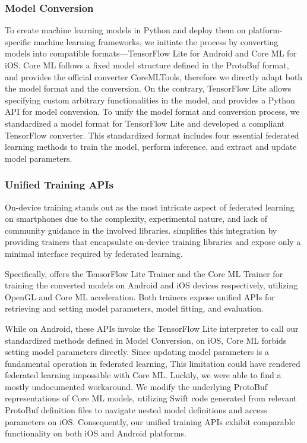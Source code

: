 \subsubsection{Model Conversion}
To create machine learning models in Python and deploy them on platform-specific
machine learning frameworks,
we initiate the process by converting models into compatible
formats---TensorFlow Lite for Android and Core ML for iOS.
Core ML follows a fixed model structure defined in the ProtoBuf format,
and provides the official converter CoreMLTools,
therefore we directly adapt both the model format and the conversion.
On the contrary,
TensorFlow Lite allows specifying custom arbitrary functionalities in the model,
and provides a Python API for model conversion.
To unify the model format and conversion process,
we standardized a model format for TensorFlow Lite and developed a compliant
TensorFlow converter.
This standardized format includes four essential federated learning methods to
train the model, perform inference, and extract and update model parameters.

\subsubsection{Unified Training APIs}
On-device training stands out as the most intricate aspect of federated learning
on smartphones due to the complexity, experimental nature,
and lack of community guidance in the involved libraries.
\fedkit simplifies this integration by providing trainers that encapsulate
on-device training libraries and expose only a minimal interface required by
federated learning.

Specifically,
\fedkit offers the TensorFlow Lite Trainer and the Core ML Trainer for training
the converted models on Android and iOS devices respectively,
utilizing OpenGL and Core ML acceleration.
Both trainers expose unified APIs for retrieving and setting model parameters,
model fitting, and evaluation.

While on Android,
these APIs invoke the TensorFlow Lite interpreter to call our standardized
methods defined in Model Conversion, on iOS,
Core ML forbids setting model parameters directly.
Since updating model parameters is a fundamental operation in federated
learning,
This limitation could have rendered federated learning impossible with Core ML.
Luckily, we were able to find a mostly undocumented workaround.
We modify the underlying ProtoBuf representations of Core ML models,
utilizing Swift code generated from relevant ProtoBuf definition files to
navigate nested model definitions and access parameters on iOS. Consequently,
our unified training APIs exhibit comparable functionality on both iOS and
Android platforms.

